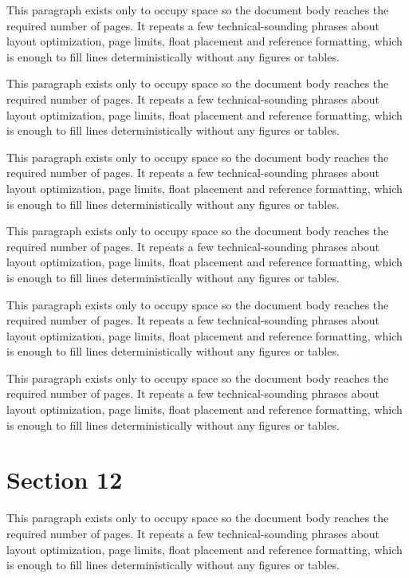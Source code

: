 \documentclass[10pt,letterpaper]{article}
\begin{document}
This paragraph exists only to occupy space so the document body reaches the required number of pages. It repeats a few technical-sounding phrases about layout optimization, page limits, float placement and reference formatting, which is enough to fill lines deterministically without any figures or tables.

This paragraph exists only to occupy space so the document body reaches the required number of pages. It repeats a few technical-sounding phrases about layout optimization, page limits, float placement and reference formatting, which is enough to fill lines deterministically without any figures or tables.

This paragraph exists only to occupy space so the document body reaches the required number of pages. It repeats a few technical-sounding phrases about layout optimization, page limits, float placement and reference formatting, which is enough to fill lines deterministically without any figures or tables.

This paragraph exists only to occupy space so the document body reaches the required number of pages. It repeats a few technical-sounding phrases about layout optimization, page limits, float placement and reference formatting, which is enough to fill lines deterministically without any figures or tables.

This paragraph exists only to occupy space so the document body reaches the required number of pages. It repeats a few technical-sounding phrases about layout optimization, page limits, float placement and reference formatting, which is enough to fill lines deterministically without any figures or tables.

This paragraph exists only to occupy space so the document body reaches the required number of pages. It repeats a few technical-sounding phrases about layout optimization, page limits, float placement and reference formatting, which is enough to fill lines deterministically without any figures or tables.

\section{Section 12}
This paragraph exists only to occupy space so the document body reaches the required number of pages. It repeats a few technical-sounding phrases about layout optimization, page limits, float placement and reference formatting, which is enough to fill lines deterministically without any figures or tables.
\end{document}
